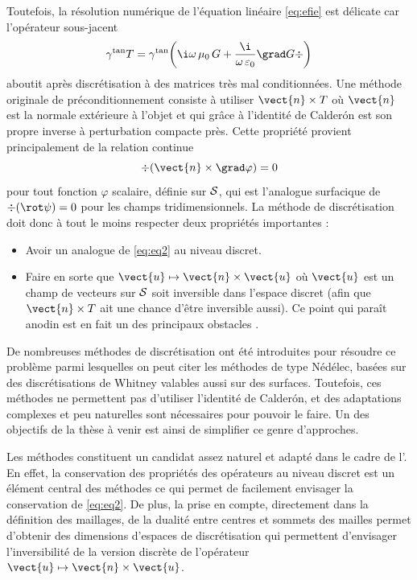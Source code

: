 Toutefois, la résolution numérique de l'équation linéaire \ref{eq:efie} est délicate car l'opérateur sous-jacent
\[
\gamma^\mathrm{tan} T = \gamma^\mathrm{tan} \mathopen{}\left( \i \omega \, \mu_0 \, G + \frac{\i}{\omega \, \varepsilon_0} \grad G \div \right)
\] 
aboutit après discrétisation à des matrices très mal conditionnées. Une méthode originale de préconditionnement \cite{christiansen_preconditioner_2002,andriulli_multiplicative_2008} consiste à utiliser $\vect{n} \times T$ où $\vect{n}$ est la normale extérieure à l'objet et qui grâce à l'identité de Calder\'on est son propre inverse à perturbation compacte près. Cette propriété provient principalement de la relation continue
\begin{equation} \label{eq:eq2}
\div(\vect{n} \times \grad \varphi) = 0
\end{equation}
pour tout fonction $\varphi$ scalaire, définie sur $\mathcal{S}$, qui est l'analogue surfacique de $\div(\rot \psi) = 0$ pour les champs tridimensionnels. La méthode de discrétisation doit donc à tout le moins respecter deux propriétés importantes :
\begin{itemize}
    \item Avoir un analogue de \ref{eq:eq2} au niveau discret.
    \item Faire en sorte que $\vect{u} \mapsto \vect{n} \times \vect{u}$ où $\vect{u}$ est un champ de vecteurs sur $\mathcal{S}$ soit inversible dans l'espace discret (afin que $\vect{n} \times T$ ait une chance d'être inversible aussi). Ce point qui paraît anodin est en fait un des principaux obstacles \cite{buffa_dual_2005}.
\end{itemize}

De nombreuses méthodes de discrétisation ont été introduites pour résoudre ce problème parmi lesquelles on peut citer les méthodes de type Nédélec, basées sur des discrétisations de Whitney valables aussi sur des surfaces. Toutefois, ces méthodes ne permettent pas d'utiliser l'identité de Calder\'on, et des adaptations complexes et peu naturelles sont nécessaires pour pouvoir le faire. Un des objectifs de la thèse à venir est ainsi de simplifier ce genre d'approches. 

Les méthodes \ddfv constituent un candidat assez naturel et adapté dans le cadre de l'\efie. En effet, la conservation des propriétés des opérateurs au niveau discret est un élément central des méthodes \ddfv ce qui permet de facilement envisager la conservation de \ref{eq:eq2}. De plus, la prise en compte, directement dans la définition des maillages, de la dualité entre centres et sommets des mailles permet d'obtenir des dimensions d'espaces de discrétisation qui permettent d'envisager l'inversibilité de la version discrète de l'opérateur $\vect{u} \mapsto \vect{n} \times \vect{u}$. 